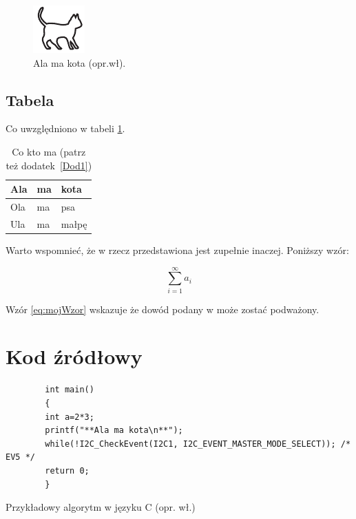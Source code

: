 \begin{figure}[H]
    \centering\includegraphics[width=.4\textwidth]{img/kotek}
    \caption{Ala ma kota (opr.wł).}\label{rysunek:kot}
\end{figure}

\subsection{Tabela}

Co uwzględniono w tabeli \ref{tabela:coktoma}. \lipsum[13-15]

\begin{table}[h!]
    \centering\caption{Co kto ma \cite{harel_rzecz_2008} (patrz też dodatek~\ref{Dod1}) \label{tabela:coktoma}}
    \begin{tabular}{|l|l|l|}%
        \hline
        Ala & ma & kota \\
        \hline
        Ola & ma & psa \\
        \hline
        Ula & ma & małpę\\
        \hline
    \end{tabular}
\end{table}

\lipsum[19-20] Warto wspomnieć, że w \cite{aizawa_groundwater_2009} rzecz przedstawiona jest zupełnie inaczej. Poniższy wzór:

\begin{equation}
    \sum_{i=1}^{\infty}a_i
    \label{eq:mojWzor}
\end{equation}

Wzór \ref{eq:mojWzor} wskazuje że dowód podany w \cite{kaleta_experimental_2005} może zostać podważony. \lipsum[9]

\section{Kod źródłowy}

\begin{listing}[h!]
    \begin{verbatim}
        int main()
        {
        int a=2*3;
        printf("**Ala ma kota\n**");
        while(!I2C_CheckEvent(I2C1, I2C_EVENT_MASTER_MODE_SELECT)); /* EV5 */
        return 0;
        }
    \end{verbatim}
    \caption{Przykładowy algorytm w języku C (opr. wł.)} \label{listing:moj}
\end{listing}

